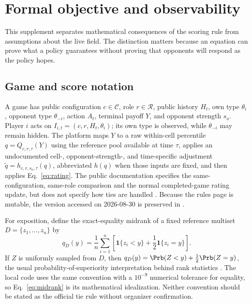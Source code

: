 \section{Formal objective and observability}
\label{app:objective}

This supplement separates mathematical consequences of the scoring rule from
assumptions about the live field. The distinction matters because an equation
can prove what a policy guarantees without proving that opponents will respond
as the policy hopes.

\subsection{Game and score notation}

A game has public configuration $c\in\mathcal C$, role $r\in\mathcal R$,
public history $H_t$, own type $\theta_i$, opponent type $\theta_{-i}$, action
$A_t$, terminal payoff $Y$, and opponent strength $s_o$. Player $i$ acts on
$I_{i,t}=(c,r,H_t,\theta_i)$; its own type is observed, while
$\theta_{-i}$ may remain hidden. The platform maps $Y$ to a raw within-cell
percentile $q=Q_{c,r,\tau}(Y)$ using the reference pool available at time
$\tau$, applies an undocumented cell-, opponent-strength-, and
time-specific adjustment $\widetilde q=h_{c,r,s_o,\tau}(q)$, abbreviated $h(q)$
when those inputs are fixed, and then applies Eq.~\eqref{eq:rating}. The public
documentation specifies the same-configuration, same-role comparison and the
normal completed-game rating update, but does not specify how ties are handled
\citep{gleecompetition2026}. Because the rules page is mutable, the version
accessed on 2026-08-30 is preserved in .

For exposition, define the exact-equality midrank of a fixed reference multiset
$D=\{z_1,\ldots,z_n\}$ by
\begin{equation}
q_D(y)=\frac{1}{n}\sum_{i=1}^n
\left[\mathbf 1\{z_i<y\}+\frac12\mathbf 1\{z_i=y\}\right].
\label{eq:midrank}
\end{equation}
If $Z$ is uniformly sampled from $D$, then
$q_D(y)=\Prb(Z<y)+\tfrac12\Prb(Z=y)$, the usual probability-of-superiority
interpretation behind rank statistics \citep{mann1947test}. The local code uses
the same convention with a $10^{-9}$ numerical tolerance for equality, so
Eq.~\eqref{eq:midrank} is its mathematical idealization. Neither convention
should be stated as the official tie rule without organizer confirmation.

